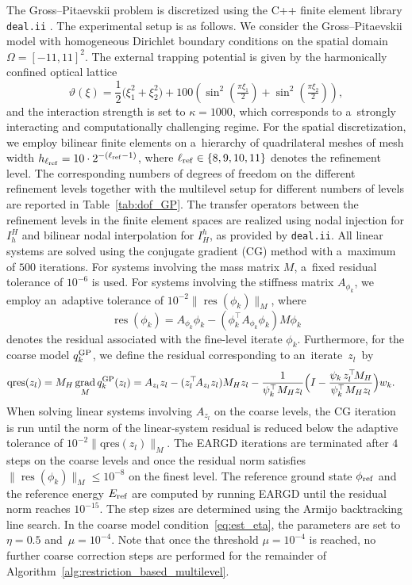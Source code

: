 \documentclass[11pt,reqno]{amsart}
\theoremstyle{plain}
\DeclareMathOperator{\grad}{grad}
\DeclareMathOperator{\res}{res}
\newcommand{\GP}{{\rm GP}}
\begin{document}
	The Gross--Pitaevskii problem is discretized using the C++ finite element library \texttt{deal.ii} \cite{ABBBFGHHKMMSTUWW25}. 
	The experimental setup is as follows. We consider the Gross--Pitaevskii model with homogeneous Dirichlet boundary conditions on the spatial domain $\Omega=[-11,11]^2$. The external trapping potential is given by the harmonically confined optical lattice  
	\[
	\vartheta(\xi)=\frac{1}{2}\big(\xi_1^2+\xi_2^2\big) 
	+ 100 \left( \sin^2\left(\tfrac{\pi\xi_1}{2}\right)+\sin^2\left(\tfrac{\pi\xi_2}{2}\right) \right),
	\]
	and the interaction strength is set to $\kappa=1000$, which corresponds to a~strongly interacting and computationally challenging regime. For the spatial discretization, we employ bilinear finite elements on a~hierarchy of quadrilateral meshes of mesh width $h_{\ell_{\rm ref}}=10\cdot 2^{-(\ell_{\rm ref}-1)}$, where $\ell_{\rm ref}\in\{8,9,10,11\}$ denotes the refinement level.  
	The corresponding numbers of degrees of freedom on the different refinement levels together with the multilevel setup for different numbers of levels are reported in Table~\ref{tab:dof_GP}.
	The transfer operators between the refinement levels in the finite element spaces are realized using nodal injection for $I_h^H$ and bilinear nodal interpolation for $I_H^h$, as provided by \texttt{deal.ii}. 
	All linear systems are solved using the conjugate gradient (CG) method with a~maximum of $500$ iterations. For systems involving the mass matrix $M$, a~fixed residual tolerance of $10^{-6}$ is used. For systems involving the stiffness matrix $A_{\phi_k}$, we employ an~adaptive tolerance of $10^{-2} \|\res(\phi_k)\|_{M}$, where 
	\[
	\res(\phi_k)=A_{\phi_k}\phi_k - (\phi_k^\top A_{\phi_k}\phi_k)M\phi_k
	\]
	denotes the residual associated with the fine-level iterate $\phi_k$. Furthermore, for the coarse model $q_k^\GP$, we define the residual corresponding to an~iterate~$z_l$~by
	\begin{align*}
		\mathrm{qres}(z_l)=M_H\grad_{M}q_{k}^{\GP}(z_l) 
		& =A_{z_l}z_l-(z_l^\top \!A_{z_l}z_l)M_Hz_l
		- \frac{1}{\psi_k^\top M_{H}z_l}\Big(I - \frac{\psi_k\, z_l^\top\! M_H}{\psi_k^\top M_{H}z_l}\Big)w_{k}.
	\end{align*}
	When solving linear systems involving $A_{z_l}$ on the coarse levels, the CG iteration is run until the norm of the linear-system residual is reduced below the adaptive tolerance of $10^{-2}\|\mathrm{qres}(z_l)\|_M$. 
	The EARGD iterations are terminated after $4$ steps on the coarse levels and once the residual norm satisfies $\|\res(\phi_k)\|_M\leq 10^{-8}$ on the finest level. The reference ground state $\phi_{\rm ref}$ and the reference energy $E_{\rm ref}$ are computed by running EARGD until the residual norm reaches $10^{-15}$.
	The step sizes are determined using the Armijo backtracking line search. In the coarse model condition~\eqref{eq:est_eta}, the parameters are set to~$\eta=0.5$ and~$\mu=10^{-4}$. Note that once the threshold $\mu=10^{-4}$ is reached, no further coarse correction steps are performed for the remainder of Algorithm~\ref{alg:restriction_based_multilevel}.
	
\end{document}
